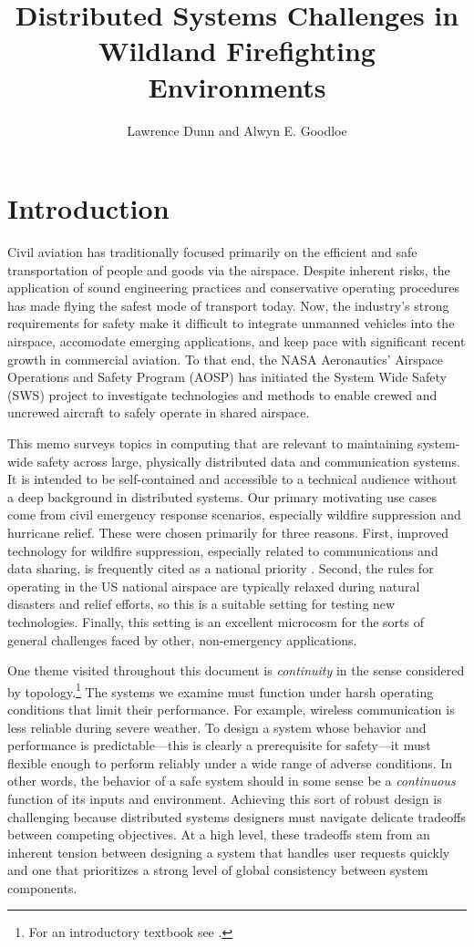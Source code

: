 \documentclass[]             %
{NASA}                       %
\title{Distributed Systems Challenges in Wildland Firefighting Environments}
\author{Lawrence Dunn and Alwyn E. Goodloe}
\theoremstyle{definition}
\begin{document}
\newpage
\setcounter{tocdepth}{2}
\tableofcontents
\newpage

\section{Introduction}
\label{sec:introduction}
Civil aviation has traditionally focused primarily on the efficient
and safe transportation of people and goods via the airspace. Despite
inherent risks, the application of sound engineering practices and
conservative operating procedures has made flying the safest mode of
transport today. Now, the industry's strong requirements for safety
make it difficult to integrate unmanned vehicles into the airspace,
accomodate emerging applications, and keep pace with significant
recent growth in commercial aviation. To that end, the NASA
Aeronautics' Airspace Operations and Safety Program (AOSP) has
initiated the System Wide Safety (SWS) project to investigate
technologies and methods to enable crewed and uncrewed aircraft to
safely operate in shared airspace.

This memo surveys topics in computing that are relevant to maintaining
system-wide safety across large, physically distributed data and
communication systems. It is intended to be self-contained and
accessible to a technical audience without a deep background in
distributed systems. Our primary motivating use cases come from civil
emergency response scenarios, especially wildfire suppression and
hurricane relief. These were chosen primarily for three
reasons. First, improved technology for wildfire suppression,
especially related to communications and data sharing, is frequently
cited as a national priority \cite{pcast2023}.  Second, the rules for
operating in the US national airspace are typically relaxed during
natural disasters and relief efforts, so this is a suitable setting
for testing new technologies. Finally, this setting is an excellent
microcosm for the sorts of general challenges faced by other,
non-emergency applications.

One theme visited throughout this document is \emph{continuity} in the
sense considered by topology.\footnote{For an introductory textbook
  see \cite{mendelson2012introduction}.}  The systems we examine must
function under harsh operating conditions that limit their
performance. For example, wireless communication is less reliable
during severe weather. To design a system whose behavior and
performance is predictable---this is clearly a prerequisite for
safety---it must flexible enough to perform reliably under a wide
range of adverse conditions. In other words, the behavior of a safe
system should in some sense be a \emph{continuous} function of its
inputs and environment. Achieving this sort of robust design is
challenging because distributed systems designers must navigate
delicate tradeoffs between competing objectives. At a high level,
these tradeoffs stem from an inherent tension between designing a
system that handles user requests quickly and one that prioritizes a
strong level of global consistency between system components.
\end{document}
